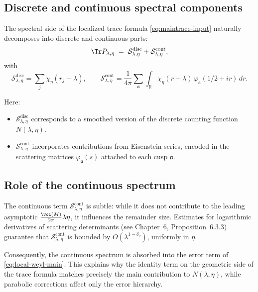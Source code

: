 
\subsection{Discrete and continuous spectral components}

The spectral side of the localized trace formula \eqref{eq:maintrace-input} naturally decomposes into discrete and continuous parts:
\[
\Tr P_{\lambda,\eta}
\;=\;\mathcal{S}^{\mathrm{disc}}_{\lambda,\eta} + \mathcal{S}^{\mathrm{cont}}_{\lambda,\eta},
\]
with
\[
\mathcal{S}^{\mathrm{disc}}_{\lambda,\eta}
=\sum_j \chi_\eta(r_j-\lambda), \qquad
\mathcal{S}^{\mathrm{cont}}_{\lambda,\eta}
=\frac{1}{4\pi}\sum_{\mathfrak{a}} \int_{\mathbb{R}}
\chi_\eta(r-\lambda)\,\varphi_{\mathfrak{a}}(1/2+ir)\,dr.
\]

Here:
\begin{itemize}
  \item $\mathcal{S}^{\mathrm{disc}}_{\lambda,\eta}$ corresponds to a smoothed version of the discrete counting function $N(\lambda,\eta)$.
  \item $\mathcal{S}^{\mathrm{cont}}_{\lambda,\eta}$ incorporates contributions from Eisenstein series, encoded in the scattering matrices $\varphi_\mathfrak{a}(s)$ attached to each cusp $\mathfrak{a}$.
\end{itemize}

\subsection{Role of the continuous spectrum}

The continuous term $\mathcal{S}^{\mathrm{cont}}_{\lambda,\eta}$ is subtle: while it does not contribute to the leading asymptotic $\tfrac{\vol(M)}{2\pi}\lambda\eta$, it influences the remainder size. Estimates for logarithmic derivatives of scattering determinants (see Chapter~6, Proposition~6.3.3) guarantee that $\mathcal{S}^{\mathrm{cont}}_{\lambda,\eta}$ is bounded by $O(\lambda^{1-\delta_2})$, uniformly in $\eta$.

Consequently, the continuous spectrum is absorbed into the error term of \eqref{eq:local-weyl-main}. This explains why the identity term on the geometric side of the trace formula matches precisely the main contribution to $N(\lambda,\eta)$, while parabolic corrections affect only the error hierarchy.

